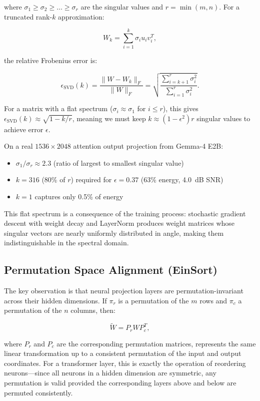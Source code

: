 \documentclass[11pt,a4paper]{article}
\begin{document}
where $\sigma_1 \geq \sigma_2 \geq \dots \geq \sigma_r$ are the singular values and
$r = \min(m, n)$. For a truncated rank-$k$ approximation:

\[
	W_k = \sum_{i=1}^k \sigma_i u_i v_i^T,
\]

the relative Frobenius error is:

\[
	\epsilon_{\text{SVD}}(k) = \frac{\|W - W_k\|_F}{\|W\|_F} = \sqrt{\frac{\sum_{i=k+1}^r \sigma_i^2}{\sum_{i=1}^r \sigma_i^2}}.
\]

For a matrix with a flat spectrum ($\sigma_i \approx \sigma_1$ for $i \leq r$), this
gives $\epsilon_{\text{SVD}}(k) \approx \sqrt{1 - k/r}$, meaning we must keep
$k \approx (1 - \epsilon^2)r$ singular values to achieve error $\epsilon$.

On a real $1536 \times 2048$ attention output projection from Gemma-4 E2B:
\begin{itemize}
	\item $\sigma_1 / \sigma_r \approx 2.3$ (ratio of largest to smallest singular value)
	\item $k=316$ (80\% of $r$) required for $\epsilon = 0.37$ (63\% energy, 4.0~dB SNR)
	\item $k=1$ captures only 0.5\% of energy
\end{itemize}

This flat spectrum is a consequence of the training process: stochastic gradient descent
with weight decay and LayerNorm produces weight matrices whose singular vectors are
nearly uniformly distributed in angle, making them indistinguishable in the spectral
domain.

\subsection{Permutation Space Alignment (EinSort)}

The key observation is that neural projection layers are permutation-invariant across
their hidden dimensions. If $\pi_r$ is a permutation of the $m$ rows and $\pi_c$ a
permutation of the $n$ columns, then:

\[
	\tilde{W} = P_r W P_c^T,
\]

where $P_r$ and $P_c$ are the corresponding permutation matrices, represents the
same linear transformation up to a consistent permutation of the input and output
coordinates. For a transformer layer, this is exactly the operation of reordering
neurons---since all neurons in a hidden dimension are symmetric, any permutation is
valid provided the corresponding layers above and below are permuted consistently.
\end{document}
